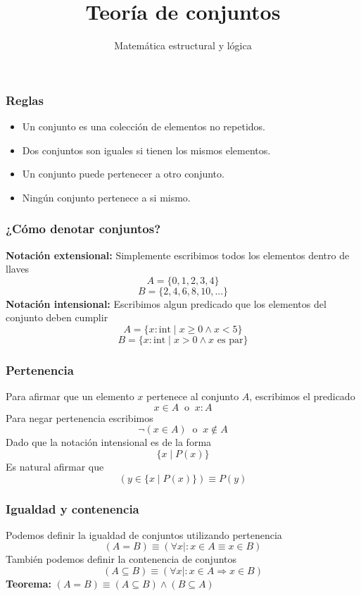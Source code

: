 \documentclass{beamer}
\title{Teoría de conjuntos}
\author{Matemática estructural y lógica}
\institute{ISIS-1104}
\date{}
\newcommand{\then}{\Rightarrow}
\begin{document}
\frame{\titlepage}

\begin{frame}[fragile]
    \frametitle{Reglas}
    \begin{itemize}
        \pause
        \item Un conjunto es una colección de elementos no repetidos.
        \pause
        \item Dos conjuntos son iguales si tienen los mismos elementos.
        \pause
        \item Un conjunto puede pertenecer a otro conjunto.
        \pause
        \item Ningún conjunto pertenece a si mismo.
    \end{itemize}
\end{frame}

\begin{frame}[fragile]
    \frametitle{¿Cómo denotar conjuntos?}
    \pause
    \textbf{Notación extensional:} Simplemente escribimos todos los elementos dentro de
    llaves
    \pause
    $$A = \{0, 1, 2, 3, 4\}$$
    \pause
    $$B = \{2, 4, 6, 8, 10, ...\}$$
    \pause
    \textbf{Notación intensional:} Escribimos algun predicado que los elementos del conjunto deben cumplir
    \pause
    $$A = \{x:\text{int} \mid x \geq 0 \land x < 5 \}$$
    \pause
    $$B = \{x:\text{int} \mid x > 0 \land x \text{ es par}\}$$    
\end{frame}

\begin{frame}[fragile]
    \frametitle{Pertenencia}
    \pause
    Para afirmar que un elemento $x$ pertenece al conjunto $A$, escribimos el predicado
    \pause
    $$x \in A\ \text{ o }\ x : A$$
    \pause
    Para negar pertenencia escribimos 
    \pause
    $$\lnot (x \in A)\ \text{ o }\ x \not \in A$$
    \pause
    Dado que la notación intensional es de la forma
    \pause
    $$\{x \mid P(x)\}$$
    \pause
    Es natural afirmar que
    \pause
    $$(y \in \{x \mid P(x)\}) \equiv P(y)$$
\end{frame}

\begin{frame}[fragile]
    \frametitle{Igualdad y contenencia}
    \pause
    Podemos definir la igualdad de conjuntos utilizando pertenencia 
    \pause
    $$(A = B) \equiv (\forall x \mid : x \in A \equiv x \in B)$$
    \pause
    También podemos definir la contenencia de conjuntos
    \pause
    $$(A \subseteq B) \equiv (\forall x \mid : x \in A \then x \in B)$$
    \pause
    \textbf{Teorema:} $(A = B) \equiv (A \subseteq B) \land (B \subseteq A)$
\end{frame}
\end{document}
